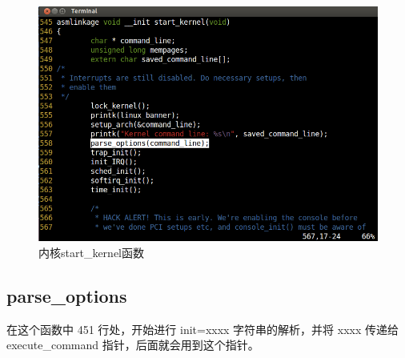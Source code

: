\begin{figure}[htbp]
\centering
\includegraphics{./pictures/start_kernel.png}
\caption{内核start\_kernel函数}
\end{figure}

\subsection{parse\_options}

在这个函数中 451 行处，开始进行 init=xxxx 字符串的解析，并将 xxxx 传递给
execute\_command 指针，后面就会用到这个指针。

